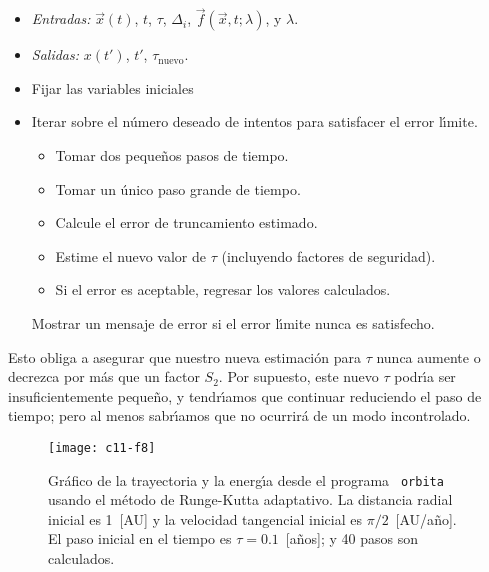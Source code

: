\begin{table}[h!]
\hrulefill
\begin{itemize}
\item {\em Entradas:} $\vec x(t)$, $t$, $\tau$, $\Delta_i$, $\vec f(\vec x,
  t;\lambda)$, y $\lambda$.
\item {\em Salidas:} $x(t')$, $t'$, $\tau_{\text{nuevo}}$.
\item Fijar las variables iniciales
\item Iterar sobre el n{\'u}mero deseado de intentos para satisfacer el
  error l{\'\i}mite.
  \begin{itemize}
  \item Tomar dos peque{\~n}os pasos de tiempo.
  \item Tomar un {\'u}nico paso grande de tiempo.
  \item Calcule el error de truncamiento estimado.
  \item Estime el nuevo valor de $\tau$ (incluyendo factores de
    seguridad).
  \item Si el error es aceptable, regresar los valores calculados.
  \end{itemize}
  Mostrar un mensaje de error si el error l{\'\i}mite nunca es satisfecho.
\end{itemize}
\hrulefill
\caption{Bosquejo de la funci{\'o}n {\tt rka}, la cual eval{\'u}a un {\'u}nico
  paso usando un m{\'e}todo adaptativo de Runge-Kutta de cuarto
  orden.}\label{c11-t5}
\end{table}

Esto obliga a asegurar que nuestro nueva estimaci{\'o}n para $\tau$ nunca
aumente o decrezca por m{\'a}s que un factor $S_2$. Por supuesto, este
nuevo $\tau$ podr{\'\i}a ser insuficientemente peque{\~n}o, y tendr{\'\i}amos que
continuar reduciendo el paso de tiempo; pero al menos sabr{\'\i}amos que no
ocurrir{\'a} de un modo incontrolado.

\begin{figure}[!h]
\begin{center}
\texttt{[image: c11-f8]}
\caption{Gr{\'a}fico de la trayectoria y la energ{\'\i}a desde el programa {\tt
    orbita} usando el m{\'e}todo de Runge-Kutta adaptativo.  La distancia
  radial inicial es 1~[AU] y la velocidad tangencial inicial es
  $\pi/2$~[AU/a{\~n}o].  El paso inicial en el tiempo es $\tau=0.1$~[a{\~n}os]; y
  40 pasos son calculados.}\label{c11-f8}
\end{center}
\end{figure}


